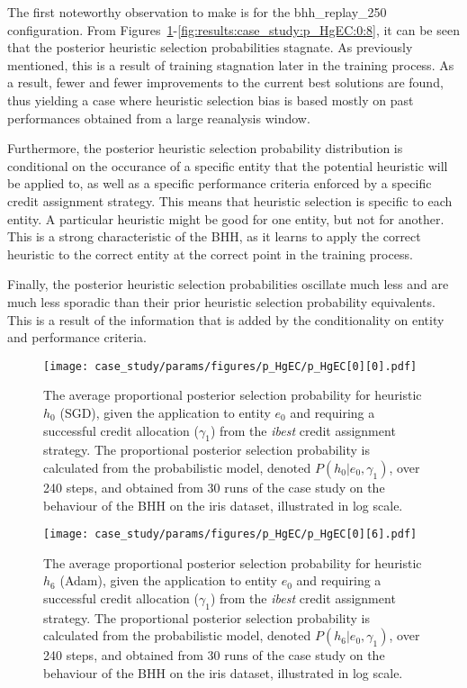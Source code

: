 The first noteworthy observation to make is for the bhh\_replay\_250 configuration. From Figures~\ref{fig:results:case_study:p_HgEC:0:0}-\ref{fig:results:case_study:p_HgEC:0:8}, it can be seen that the posterior heuristic selection probabilities stagnate. As previously mentioned, this is a result of training stagnation later in the training process. As a result, fewer and fewer improvements to the current best solutions are found, thus yielding a case where heuristic selection bias is based mostly on past performances obtained from a large reanalysis window.

Furthermore, the posterior heuristic selection probability distribution is conditional on the occurance of a specific entity that the potential heuristic will be applied to, as well as a specific performance criteria enforced by a specific credit assignment strategy. This means that heuristic selection is specific to each entity. A particular heuristic might be good for one entity, but not for another. This is a strong characteristic of the \acs{BHH}, as it learns to apply the correct heuristic to the correct entity at the correct point in the training process.

Finally, the posterior heuristic selection probabilities oscillate much less and are much less sporadic than their prior heuristic selection probability equivalents. This is a result of the information that is added by the conditionality on entity and performance criteria.

\begin{figure}[htpb]
	\centering
	\texttt{[image: case\_study/params/figures/p\_HgEC/p\_HgEC[0][0].pdf]}
	\caption{The average proportional posterior selection probability for heuristic $h_{0}$ (\acs{SGD}), given the application to entity $e_{0}$ and requiring a successful credit allocation ($\gamma_{1}$) from the \textit{ibest} credit assignment strategy. The proportional posterior selection probability is calculated from the probabilistic model, denoted $P(h_{0} \vert e_{0}, \gamma_{1})$, over 240 steps, and obtained from 30 runs of the case study on the behaviour of the \acs{BHH} on the iris dataset, illustrated in log scale.}
	\label{fig:results:case_study:p_HgEC:0:0}
\end{figure}

\begin{figure}[htpb]
	\centering
	\texttt{[image: case\_study/params/figures/p\_HgEC/p\_HgEC[0][6].pdf]}
	\caption{The average proportional posterior selection probability for heuristic $h_{6}$ (\acs{Adam}), given the application to entity $e_{0}$ and requiring a successful credit allocation ($\gamma_{1}$) from the \textit{ibest} credit assignment strategy. The proportional posterior selection probability is calculated from the probabilistic model, denoted $P(h_{6} \vert e_{0}, \gamma_{1})$, over 240 steps, and obtained from 30 runs of the case study on the behaviour of the \acs{BHH} on the iris dataset, illustrated in log scale.}
	\label{fig:results:case_study:p_HgEC:0:6}
\end{figure}

